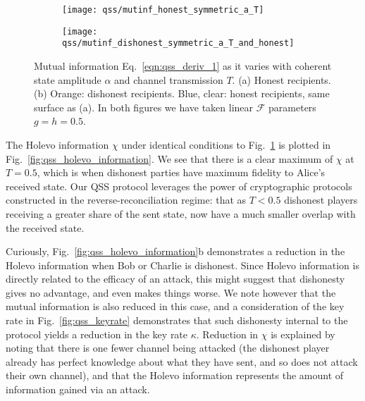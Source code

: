 \begin{figure}[htp]
\centering
	\begin{subfigure}{0.49\linewidth}
	\centering
	\texttt{[image: qss/mutinf\_honest\_symmetric\_a\_T]}
	\caption{}
	\end{subfigure}
	\begin{subfigure}{0.49\linewidth}
	\centering
	\texttt{[image: qss/mutinf\_dishonest\_symmetric\_a\_T\_and\_honest]}
	\caption{}
	\end{subfigure}
\caption{\label{fig:qss_mutual_information} Mutual information Eq.~\ref{eqn:qss_deriv_1} as it varies with coherent state amplitude $\alpha$ and channel transmission $T$. (a) Honest recipients. (b) Orange: dishonest recipients. Blue, clear: honest recipients, same surface as (a). In both figures we have taken linear $\mathcal{F}$ parameters $g = h = 0.5$.}
\end{figure}

The Holevo information $\chi$ under identical conditions to Fig.~\ref{fig:qss_mutual_information} is plotted in Fig.~\ref{fig:qss_holevo_information}. We see that there is a clear maximum of $\chi$ at $T = 0.5$, which is when dishonest parties have maximum fidelity to Alice's received state. Our QSS protocol leverages the power of cryptographic protocols constructed in the reverse-reconciliation regime: that as $T < 0.5$ dishonest players receiving a greater share of the sent state, now have a much smaller overlap with the received state. 

Curiously, Fig.~\ref{fig:qss_holevo_information}b demonstrates a reduction in the Holevo information when Bob or Charlie is dishonest. Since Holevo information is directly related to the efficacy of an attack, this might suggest that dishonesty gives no advantage, and even makes things worse. We note however that the mutual information is also reduced in this case, and a consideration of the key rate in Fig.~\ref{fig:qss_keyrate} demonstrates that such dishonesty internal to the protocol yields a reduction in the key rate $\kappa$. Reduction in $\chi$ is explained by noting that there is one fewer channel being attacked (the dishonest player already has perfect knowledge about what they have sent, and so does not attack their own channel), and that the Holevo information represents the amount of information gained via an attack.


